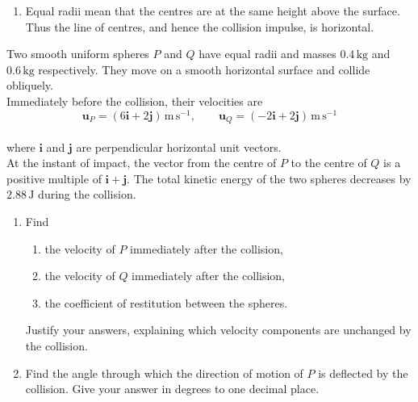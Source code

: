 \documentclass[leqno]{article}
\begin{document}
\begin{enumerate}[
  label=\textbf{\arabic*.},
  leftmargin=*,
  topsep=0pt,
  partopsep=0pt,
  parsep=0pt
]
\begin{djsSolution}
\begin{enumerate}[label=\textbf{(\alph*)}, start=1]
The angle \(\theta\) through which \(Q\) is deflected is the angle between \(\mathbf{u}_Q\) and \(\mathbf{v}_Q\). Both have magnitude \(\sqrt{13}\), so
\begin{align*}
\cos\theta&=\frac{\mathbf{u}_Q\cdot\mathbf{v}_Q}{|\mathbf{u}_Q|\,|\mathbf{v}_Q|}=\frac{1.2(3.6)+(-3.4)(-0.2)}{13}=\frac{5}{13}\\
\theta&\approx67.4^\circ\qquad\text{(1 d.p.)}
\end{align*}

\item Equal radii mean that the centres are at the same height above the surface. Thus the line of centres, and hence the collision impulse, is horizontal.
\end{enumerate}
\end{djsSolution}

\newpage

\questionitem

Two smooth uniform spheres $P$ and $Q$ have equal radii and masses $0.4\,\mathrm{kg}$ and $0.6\,\mathrm{kg}$ respectively. They move on a smooth horizontal surface and collide obliquely. \\

Immediately before the collision, their velocities are
\[
\mathbf{u}_P=(6\mathbf{i}+2\mathbf{j})\,\mathrm{m\,s^{-1}},\qquad \mathbf{u}_Q=(-2\mathbf{i}+2\mathbf{j})\,\mathrm{m\,s^{-1}}
\] \\
where $\mathbf{i}$ and $\mathbf{j}$ are perpendicular horizontal unit vectors. \\

At the instant of impact, the vector from the centre of $P$ to the centre of $Q$ is a positive multiple of $\mathbf{i}+\mathbf{j}$. The total kinetic energy of the two spheres decreases by $2.88\,\mathrm{J}$ during the collision. \\
\begin{enumerate}[label=\textbf{(\alph*)}]
\item Find
\begin{enumerate}[label=(\roman*)]
\item the velocity of $P$ immediately after the collision,
\item the velocity of $Q$ immediately after the collision,
\item the coefficient of restitution between the spheres.
\end{enumerate}
Justify your answers, explaining which velocity components are unchanged by the collision.  \\
\item Find the angle through which the direction of motion of $P$ is deflected by the collision. Give your answer in degrees to one decimal place.  \\
\end{enumerate}


\end{enumerate}
\end{document}

